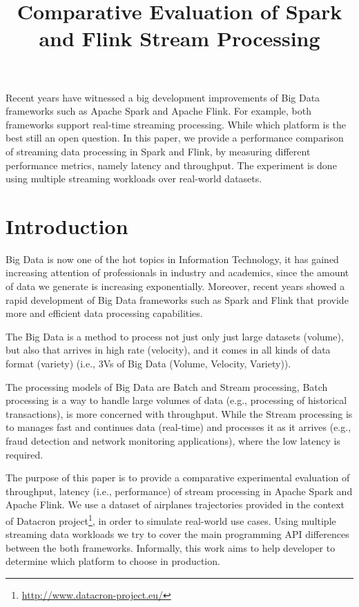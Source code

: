 \documentclass[]{article}
\title{Comparative Evaluation of Spark and Flink Stream Processing}
\begin{document}
\maketitle
\newpage
\tableofcontents

\newpage


\begin{abstract}

\end{abstract}
Recent years have witnessed a big development improvements of Big Data frameworks such as Apache Spark and Apache Flink. For example, both frameworks support real-time
streaming processing. While which platform is the best still an open question. 
In this paper, we provide a performance comparison of streaming data processing in Spark and Flink, by measuring different performance metrics, namely latency and throughput. The experiment is done using multiple streaming workloads over real-world datasets.
\section{Introduction}

\par Big Data is now one of the hot topics in Information Technology, it has gained increasing attention of professionals in industry and academics, since the amount of data we generate is increasing exponentially. Moreover, recent years showed a rapid development of Big Data frameworks such as Spark and Flink that provide more and efficient data processing capabilities.
 \par The Big Data is a method to process not just only just large datasets (volume), but also that arrives in high rate (velocity), and it comes in all kinds of data format (variety) (i.e., 3Vs of Big Data (Volume, Velocity, Variety))\cite{svs}.

\par The processing models of Big Data are Batch and Stream processing, Batch processing is a way to handle large volumes of data (e.g., processing of historical transactions), is more concerned with throughput. While the Stream processing  is to manages fast and continues data (real-time) and processes it as it arrives (e.g., fraud detection and network monitoring applications), where the low latency is required.

\par The purpose of this paper is to provide a comparative experimental evaluation of throughput, latency (i.e., performance) of stream processing in Apache Spark and Apache Flink. We use a dataset of airplanes trajectories provided in the context of Datacron project\footnote{\url{http://www.datacron-project.eu/}}, in order to simulate real-world use cases. Using multiple streaming data workloads we try to cover the main programming API differences between the both frameworks. Informally,  this work aims to help developer to determine which platform to choose in production. 
\end{document}

